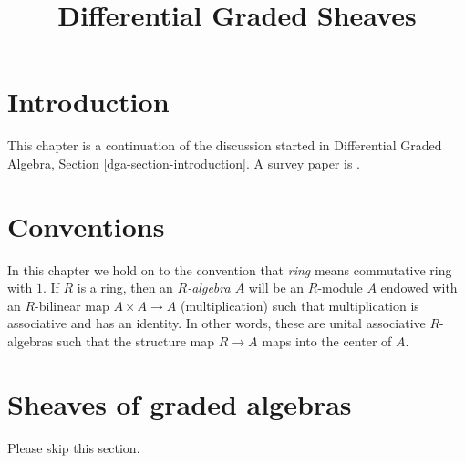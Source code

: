 

%


\title{Differential Graded Sheaves}


\maketitle

\label{section-phantom}

\tableofcontents

\section{Introduction}
\label{section-introduction}

\noindent
This chapter is a continuation of the discussion started in
Differential Graded Algebra, Section \ref{dga-section-introduction}.
A survey paper is \cite{Keller-survey}.




\section{Conventions}
\label{section-conventions}

\noindent
In this chapter we hold on to the convention that {\it ring} means
commutative ring with $1$. If $R$ is a ring, then an {\it $R$-algebra $A$}
will be an $R$-module $A$ endowed with an $R$-bilinear map $A \times A \to A$
(multiplication) such that multiplication is associative and has an
identity.
In other words, these are unital associative $R$-algebras
such that the structure map $R \to A$ maps into the center of $A$.








\section{Sheaves of graded algebras}
\label{section-ga}

\noindent
Please skip this section.

